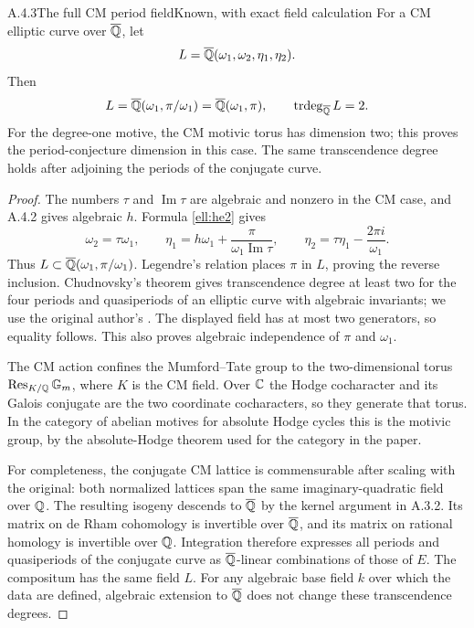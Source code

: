 \begin{result}{A.4.3}{The full CM period field}{Known, with exact field calculation}
For a CM elliptic curve over $\overline{\mathbb Q}$, let
\[
 L=\overline{\mathbb Q}(\omega_1,\omega_2,\eta_1,\eta_2).
\]
Then
\[
 L=\overline{\mathbb Q}(\omega_1,\pi/\omega_1)=\overline{\mathbb Q}(\omega_1,\pi),
 \qquad \operatorname{trdeg}_{\overline{\mathbb Q}}L=2.
\]
For the degree-one motive, the CM motivic torus has dimension two; this proves the period-conjecture dimension in this case. The same transcendence degree holds after adjoining the periods of the conjugate curve.
\end{result}
\begin{proof}
The numbers $\tau$ and $\operatorname{Im}\tau$ are algebraic and nonzero in the CM case, and A.4.2 gives algebraic $h$. Formula \eqref{ell:he2} gives
\[
 \omega_2=\tau\omega_1,\qquad
 \eta_1=h\omega_1+\frac{\pi}{\omega_1\operatorname{Im}\tau},
 \qquad \eta_2=\tau\eta_1-\frac{2\pi i}{\omega_1}.
\]
Thus $L\subset\overline{\mathbb Q}(\omega_1,\pi/\omega_1)$. Legendre's relation places $\pi$ in $L$, proving the reverse inclusion. Chudnovsky's theorem gives transcendence degree at least two for the four periods and quasiperiods of an elliptic curve with algebraic invariants; we use the original author's \cite[\S2A, Theorem 1, p.343, with the algebraic-invariant convention on p.339]{EllChudnovsky1978}. The displayed field has at most two generators, so equality follows. This also proves algebraic independence of $\pi$ and $\omega_1$.

The CM action confines the Mumford--Tate group to the two-dimensional torus $\operatorname{Res}_{K/\mathbb Q}\mathbb G_m$, where $K$ is the CM field. Over $\mathbb C$ the Hodge cocharacter and its Galois conjugate are the two coordinate cocharacters, so they generate that torus. In the category of abelian motives for absolute Hodge cycles this is the motivic group, by the absolute-Hodge theorem used for the category in the paper.

For completeness, the conjugate CM lattice is commensurable after scaling with the original: both normalized lattices span the same imaginary-quadratic field over $\mathbb Q$. The resulting isogeny descends to $\overline{\mathbb Q}$ by the kernel argument in A.3.2. Its matrix on de Rham cohomology is invertible over $\overline{\mathbb Q}$, and its matrix on rational homology is invertible over $\mathbb Q$. Integration therefore expresses all periods and quasiperiods of the conjugate curve as $\overline{\mathbb Q}$-linear combinations of those of $E$. The compositum has the same field $L$. For any algebraic base field $k$ over which the data are defined, algebraic extension to $\overline{\mathbb Q}$ does not change these transcendence degrees.
\end{proof}

